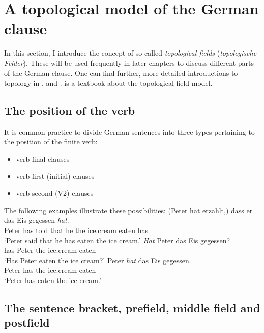 \section{A topological model of the German clause}
\label{sec-topo}
\label{Abschnitt-Toplogie}

%

In this section, I introduce the concept of so-called \emph{topological fields} (\emph{topologische Felder}). These will be used frequently in later chapters to
discuss different parts of the German clause. One can find further, more detailed introductions to topology in ,
 and .  is a
textbook about the topological field model.




\subsection{The position of the verb}

\largerpage
It is common practice to divide German sentences into three types pertaining to the position of the finite verb:
\begin{itemize}
\item verb-final clauses
\item verb-first (initial) clauses
\item verb-second (V2) clauses
\end{itemize}
%
The following examples illustrate these possibilities:
\eal
\ex 
\gll (Peter hat erzählt,) dass er das Eis gegessen \emph{hat}.\\
     Peter has told that he the ice.cream eaten has\\
\glt `Peter said that he has eaten the ice cream.'
\ex 
\gll \emph{Hat} Peter das Eis gegessen?\\
	 has Peter the ice.cream eaten\\
\glt `Has Peter eaten the ice cream?'
\ex 
\gll Peter \emph{hat} das Eis gegessen.\\
	 Peter has the ice.cream eaten\\
\glt `Peter has eaten the ice cream.'
\zl


\subsection{The sentence bracket, prefield, middle field and postfield}

